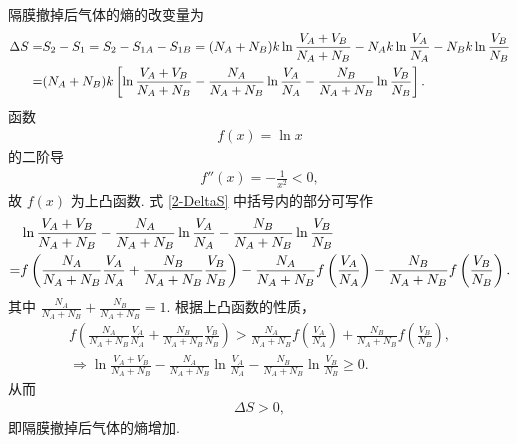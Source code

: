 \documentclass{assignment}
\begin{document}
\begin{pf}
    隔膜撤掉后气体的熵的改变量为
    \begin{align}
        \label{2-DeltaS}
        \notag\Delta S=&S_2-S_1=S_2-S_{1A}-S_{1B}=(N_A+N_B)k\ln\frac{V_A+V_B}{N_A+N_B}-N_Ak\ln\frac{V_A}{N_A}-N_Bk\ln\frac{V_B}{N_B}\\
        =&(N_A+N_B)k\left[\ln\frac{V_A+V_B}{N_A+N_B}-\frac{N_A}{N_A+N_B}\ln\frac{V_A}{N_A}-\frac{N_B}{N_A+N_B}\ln\frac{V_B}{N_B}\right].
    \end{align}
    函数
    \begin{align}
        f(x)=\ln x
    \end{align}
    的二阶导
    \begin{align}
        f''(x)=-\frac{1}{x^2}<0,
    \end{align}
    故 $f(x)$ 为上凸函数. 式 \eqref{2-DeltaS} 中括号内的部分可写作
    \begin{align}
        \notag&\ln\frac{V_A+V_B}{N_A+N_B}-\frac{N_A}{N_A+N_B}\ln\frac{V_A}{N_A}-\frac{N_B}{N_A+N_B}\ln\frac{V_B}{N_B}\\
        =&f\left(\frac{N_A}{N_A+N_B}\frac{V_A}{N_A}+\frac{N_B}{N_A+N_B}\frac{V_B}{N_B}\right)-\frac{N_A}{N_A+N_B}f\left(\frac{V_A}{N_A}\right)-\frac{N_B}{N_A+N_B}f\left(\frac{V_B}{N_B}\right).
    \end{align}
    其中 $\frac{N_A}{N_A+N_B}+\frac{N_B}{N_A+N_B}=1$. 根据上凸函数的性质，
    \begin{gather}
        f\left(\frac{N_A}{N_A+N_B}\frac{V_A}{N_A}+\frac{N_B}{N_A+N_B}\frac{V_B}{N_B}\right)>\frac{N_A}{N_A+N_B}f\left(\frac{V_A}{N_A}\right)+\frac{N_B}{N_A+N_B}f\left(\frac{V_B}{N_B}\right),\\
        \Longrightarrow\ln\frac{V_A+V_B}{N_A+N_B}-\frac{N_A}{N_A+N_B}\ln\frac{V_A}{N_A}-\frac{N_B}{N_A+N_B}\ln\frac{V_B}{N_B}\geq 0.
    \end{gather}
    从而
    \begin{align}
        \Delta S>0,
    \end{align}
    即隔膜撤掉后气体的熵增加.
\end{pf}
\end{document}
